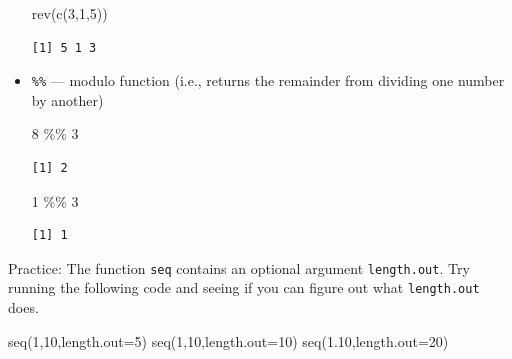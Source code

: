 \documentclass[
  letterpaper,
  DIV=11,
  numbers=noendperiod]{scrreprt}
\newenvironment{Shaded}{\begin{snugshade}}{\end{snugshade}}
\newcommand{\AttributeTok}[1]{\textcolor[rgb]{0.40,0.45,0.13}{#1}}
\newcommand{\DecValTok}[1]{\textcolor[rgb]{0.68,0.00,0.00}{#1}}
\newcommand{\FloatTok}[1]{\textcolor[rgb]{0.68,0.00,0.00}{#1}}
\newcommand{\FunctionTok}[1]{\textcolor[rgb]{0.28,0.35,0.67}{#1}}
\newcommand{\NormalTok}[1]{\textcolor[rgb]{0.00,0.23,0.31}{#1}}
\newcommand{\SpecialCharTok}[1]{\textcolor[rgb]{0.37,0.37,0.37}{#1}}
\begin{document}
\begin{itemize}
\begin{Shaded}
\begin{Highlighting}[]
\FunctionTok{rev}\NormalTok{(}\FunctionTok{c}\NormalTok{(}\DecValTok{3}\NormalTok{,}\DecValTok{1}\NormalTok{,}\DecValTok{5}\NormalTok{))}
\end{Highlighting}
\end{Shaded}

\begin{verbatim}
[1] 5 1 3
\end{verbatim}
\item
  \texttt{\%\%} --- modulo function (i.e., returns the remainder from
  dividing one number by another)

\begin{Shaded}
\begin{Highlighting}[]
\DecValTok{8} \SpecialCharTok{\%\%} \DecValTok{3}
\end{Highlighting}
\end{Shaded}

\begin{verbatim}
[1] 2
\end{verbatim}

\begin{Shaded}
\begin{Highlighting}[]
\DecValTok{1} \SpecialCharTok{\%\%} \DecValTok{3}
\end{Highlighting}
\end{Shaded}

\begin{verbatim}
[1] 1
\end{verbatim}
\end{itemize}

{Practice:} The function \texttt{seq} contains an optional argument
\texttt{length.out}. Try running the following code and seeing if you
can figure out what \texttt{length.out} does.

\begin{Shaded}
\begin{Highlighting}[]
\FunctionTok{seq}\NormalTok{(}\DecValTok{1}\NormalTok{,}\DecValTok{10}\NormalTok{,}\AttributeTok{length.out=}\DecValTok{5}\NormalTok{)}
\FunctionTok{seq}\NormalTok{(}\DecValTok{1}\NormalTok{,}\DecValTok{10}\NormalTok{,}\AttributeTok{length.out=}\DecValTok{10}\NormalTok{)}
\FunctionTok{seq}\NormalTok{(}\FloatTok{1.10}\NormalTok{,}\AttributeTok{length.out=}\DecValTok{20}\NormalTok{)}
\end{Highlighting}
\end{Shaded}
\end{document}
